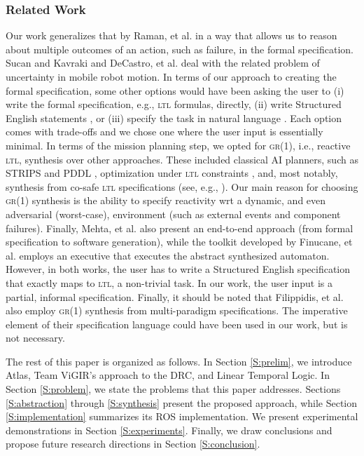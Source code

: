 \subsubsection*{Related Work}
Our work generalizes that by Raman, et al. \cite{Vasu2013ICRA} in a way that allows us to reason about multiple outcomes of an action, such as failure, in the formal specification.
Sucan and Kavraki \cite{Kavraki2012ICRA} and DeCastro, et al. \cite{Jon2015ICRA} deal with the related problem of uncertainty in mobile robot motion.
In terms of our approach to creating the formal specification, some other options would have been asking the user to (i) write the formal specification, e.g., \textsc{ltl} formulas, directly, (ii) write Structured English statements \cite{JFRKG2012ICRA}, or (iii) specify the task in natural language \cite{Lignos2015AURO}.
Each option comes with trade-offs and we chose one where the user input is essentially minimal.
In terms of the mission planning step, we opted for \textsc{gr(1)}, i.e., reactive \textsc{ltl}, synthesis \cite{Bloem2012GR1} over other approaches.
These included classical AI planners, such as STRIPS \cite{STRIPS1971AI} and PDDL \cite{PDDL1998TR}, optimization under \textsc{ltl} constraints \cite{Wolff2014ICRA}, and, most notably, synthesis from co-safe \textsc{ltl} specifications (see, e.g., \cite{Kavraki2015ICRA}).
Our main reason for choosing \textsc{gr(1)} synthesis is the ability to specify reactivity \ac{wrt} a dynamic, and even adversarial (worst-case), environment (such as external events and component failures).
Finally, Mehta, et al.\cite{Ankur2015ISRR} also present an end-to-end approach (from formal specification to software generation), while the toolkit developed by Finucane, et al. \cite{Finucane2010IROS} employs an executive that executes the abstract synthesized automaton.
However, in both works, the user has to write a Structured English \cite{JFRKG2012ICRA} specification that exactly maps to \textsc{ltl}, a non-trivial task.
In our work, the user input is a partial, informal specification.
Finally, it should be noted that Filippidis, et al. \cite{Filippidis2015SYNT} also employ \textsc{gr(1)} synthesis from multi-paradigm specifications.
The imperative element of their specification language could have been used in our work, but is not necessary.

The rest of this paper is organized as follows.
In Section \ref{S:prelim}, we introduce Atlas, Team ViGIR's approach to the DRC, and Linear Temporal Logic.
In Section \ref{S:problem}, we state the problems that this paper addresses.
Sections \ref{S:abstraction} through \ref{S:synthesis} present the proposed approach, while Section \ref{S:implementation} summarizes its ROS implementation.
We present experimental demonstrations in Section \ref{S:experiments}.
Finally, we draw conclusions and propose future research directions in Section \ref{S:conclusion}.

